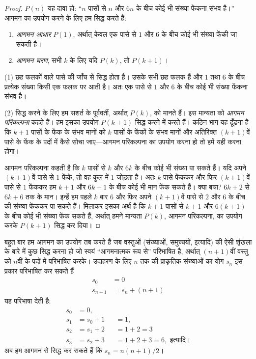 \documentclass[../../../include/open-logic-section]{subfiles}
\begin{document}
\begin{proof}
$P(n)$ यह दावा हो: ``$n$ पासों से $n$ और $6n$ के बीच कोई भी संख्या फेंकना
संभव है।'' आगमन का उपयोग करने के लिए हम सिद्ध करते हैं:
\begin{enumerate}
\item \emph{आगमन आधार} $P(1)$, अर्थात् केवल एक पासे से $1$ और $6$ के बीच
  कोई भी संख्या फेंकी जा सकती है।
\item \emph{आगमन चरण}, सभी $k$ के लिए यदि $P(k)$, तो $P(k+1)$।
\end{enumerate}

(1) छह फलकों वाले पासे की जाँच से सिद्ध होता है। उसके सभी छह फलक हैं और
$1$ तथा $6$ के बीच प्रत्येक संख्या किसी एक फलक पर आती है। अतः एक पासे से
$1$ और $6$ के बीच कोई भी संख्या फेंकना संभव है।

(2) सिद्ध करने के लिए हम सशर्त के पूर्ववर्ती, अर्थात् $P(k)$, को मानते हैं।
इस मान्यता को \emph{आगमन परिकल्पना} कहते हैं। हम इसका उपयोग $P(k+1)$ सिद्ध
करने में करते हैं। कठिन भाग यह ढूँढना है कि $k+1$ पासों के फेंक के संभव
मानों को $k$ पासों के फेंकों के संभव मानों और अतिरिक्त $(k+1)$वें पासे के
फेंक के पदों में कैसे सोचा जाए---आगमन परिकल्पना का उपयोग करना हो तो हमें यही
करना होगा।

आगमन परिकल्पना कहती है कि $k$ पासों से $k$ और $6k$ के बीच कोई भी संख्या
पा सकते हैं। यदि अपने $(k+1)$वें पासे से $1$ फेंकें, तो वह कुल में $1$
जोड़ता है। अतः $k$ पासे फेंककर और फिर $(k+1)$वें पासे से $1$ फेंककर हम
$k+1$ और $6k+1$ के बीच कोई भी मान फेंक सकते हैं। क्या बचा? $6k+2$ से
$6k+6$ तक के मान। इन्हें हम पहले $k$ बार $6$ और फिर अपने $(k+1)$वें पासे
से $2$ और $6$ के बीच की संख्या फेंककर पा सकते हैं। मिलाकर इसका अर्थ है कि
$k+1$ पासों से $k+1$ और $6(k+1)$ के बीच कोई भी संख्या फेंक सकते हैं,
अर्थात् हमने मान्यता $P(k)$, आगमन परिकल्पना, का उपयोग करके $P(k+1)$ सिद्ध
कर दिया।
\end{proof}

बहुत बार हम आगमन का उपयोग तब करते हैं जब वस्तुओं (संख्याओं, समुच्चयों,
इत्यादि) की ऐसी शृंखला के बारे में कुछ सिद्ध करना हो जो स्वयं
``आगमनात्मक रूप से'' परिभाषित है, अर्थात् $(n+1)$वीं वस्तु को $n$वीं के
पदों में परिभाषित करके। उदाहरण के लिए $n$ तक की प्राकृतिक संख्याओं का योग
$s_n$ इस प्रकार परिभाषित कर सकते हैं
\begin{align*}
  s_0 & = 0\\
  s_{n+1} & = s_n + (n+1)
\end{align*}
यह परिभाषा देती है:
\begin{align*}
  s_0 & = 0,\\
  s_1 & = s_0 + 1 && = 1,\\
  s_2 & = s_1 + 2 && = 1 + 2 = 3\\
  s_3 & = s_2 + 3 && = 1 + 2 + 3 = 6, \text{ इत्यादि।}
\end{align*}
अब हम आगमन से सिद्ध कर सकते हैं कि $s_n=n(n+1)/2$।
\end{document}
